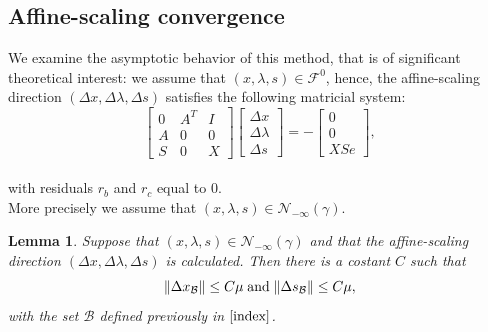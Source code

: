 \documentclass[a4paper,10 pt,titlepage,twoside]{book}
\theoremstyle{plain}
\newtheorem{lem}[thm]{Lemma}
\theoremstyle{definition}
\theoremstyle{remark}
\begin{document}
\subsection{Affine-scaling convergence}
We examine the asymptotic behavior of this method, that is of significant theoretical interest: we assume that $(x, \lambda, s)\in\mathcal{F}^{0}$, hence, the affine-scaling direction $(\Delta x, \Delta \lambda, \Delta s)$ satisfies the following matricial system:\\
\begin{equation}\label{5.1}
\begin{bmatrix}
0&A^{T}&I \\A&0&0\\S&0&X
\end{bmatrix}\begin{bmatrix}
\Delta x\\\Delta\lambda \\\Delta s
\end{bmatrix}=-\begin{bmatrix}
0\\0\\XSe
\end{bmatrix},
\end{equation}\\
with residuals $r_{b}$ and $r_{c}$ equal to 0.\\
More precisely we assume that $(x, \lambda, s)\in\mathcal{N}_{- \infty}(\gamma)$.
\begin{lem}
	Suppose that $(x, \lambda, s)\in\mathcal{N}_{- \infty}(\gamma)$ and that the affine-scaling direction $(\Delta x,\Delta \lambda, \Delta s)$ is calculated. Then there is a costant $C$ such that
	\begin{equation*}
	\lVert \Delta x_{\mathcal{B}} \rVert \leq C \mu \text{\;and\;} \lVert \Delta s_\mathcal{B} \rVert \leq C \mu,
	\end{equation*}
	with the set $\mathcal{B}$ defined previously in $\ref{index}$. 
\end{lem}
\end{document}
